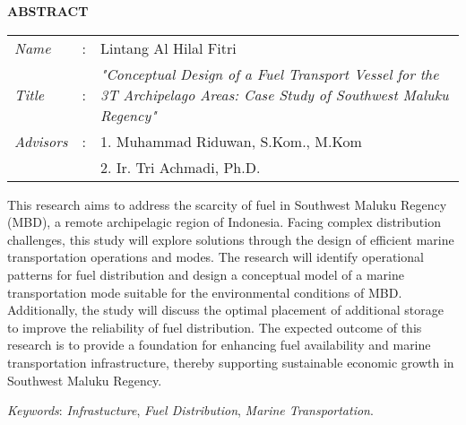 \begin{center}
  \large\textbf{ABSTRACT}
\end{center}

\vspace{2ex}

\begingroup
  \setlength{\tabcolsep}{0pt}
  \noindent
  \begin{tabularx}{\textwidth}{l >{\centering}m{2em} X}
    \emph{Name}     &:& Lintang Al Hilal Fitri \\
    \emph{Title}    &:&	\emph{"Conceptual Design of a Fuel Transport Vessel for the 3T Archipelago Areas: Case Study of Southwest Maluku Regency"} \\
    \emph{Advisors} &:& 1. Muhammad Riduwan, S.Kom., M.Kom  \\
                    & & 2. Ir. Tri Achmadi, Ph.D. \\
  \end{tabularx}
\endgroup


This research aims to address the scarcity of fuel in Southwest Maluku Regency (MBD), a remote archipelagic region of Indonesia. Facing complex distribution challenges, this study will explore solutions through the design of efficient marine transportation operations and modes. The research will identify operational patterns for fuel distribution and design a conceptual model of a marine transportation mode suitable for the environmental conditions of MBD. Additionally, the study will discuss the optimal placement of additional storage to improve the reliability of fuel distribution. The expected outcome of this research is to provide a foundation for enhancing fuel availability and marine transportation infrastructure, thereby supporting sustainable economic growth in Southwest Maluku Regency.


\emph{Keywords}: \emph{Infrastucture}, \emph{Fuel Distribution}, \emph{Marine Transportation}.
